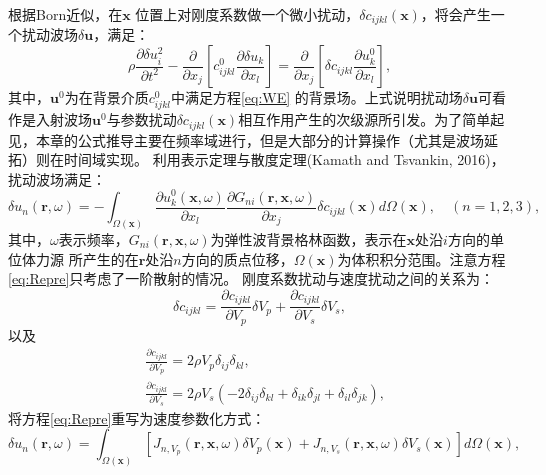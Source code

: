 根据Born近似，在$\mathbf{x}$ 位置上对刚度系数做一个微小扰动，$\delta
c_{ijkl}(\mathbf{x})$，将会产生一个扰动波场$\delta \mathbf{u}$，满足：
\begin{equation}
	\rho \frac{\partial \delta u^2_i}{\partial t^2}  -
	\frac{\partial}{\partial x_j}\left[c^0_{ijkl}\frac{\partial \delta u_{k}}{\partial
	x_l}\right]=\frac{\partial}{\partial
	x_j}\left[\delta c_{ijkl}\frac{\partial
	u^0_{k}}{\partial x_l}\right],
	\label{eq:BornApp}
\end{equation}
其中，$\mathbf{u}^0$为在背景介质$c^0_{ijkl}$中满足方程\eqref{eq:WE}
的背景场。上式说明扰动场$\delta \mathbf{u}$可看作是入射波场$\mathbf{u}^0$与参数扰动$\delta
c_{ijkl}(\mathbf{x})$相互作用产生的次级源所引发。为了简单起见，本章的公式推导主要在频率域进行，但是大部分的计算操作（尤其是波场延拓）则在时间域实现。
利用表示定理与散度定理(Kamath and Tsvankin, 2016)\cite{kamath2016elastic}，扰动波场满足：
\begin{equation}
	\delta u_n(\mathbf{r},\omega)=-\int_{\Omega(\mathbf{x})}{\frac{\partial
	u^0_{k}(\mathbf{x},\omega)}{\partial x_l}
	\frac{\partial G_{ni}(\mathbf{r},\mathbf{x},\omega)}{\partial
	x_j} \delta
	c_{ijkl}(\mathbf{x})}
	d\Omega(\mathbf{x}), \quad (n=1,2,3),
	\label{eq:Repre}
\end{equation}
其中，$\omega$表示频率，$G_{ni}(\mathbf{r},\mathbf{x},\omega)$为弹性波背景格林函数，表示在$\mathbf{x}$处沿$i$方向的单位体力源
所产生的在$\mathbf{r}$处沿$n$方向的质点位移，$\Omega(\mathbf{x})$为体积积分范围。注意方程\eqref{eq:Repre}只考虑了一阶散射的情况。
刚度系数扰动与速度扰动之间的关系为：
\begin{equation}
        \delta c_{ijkl}=\frac{\partial c_{ijkl}}{\partial V_p}\delta V_p
        +\frac{\partial c_{ijkl}}{\partial V_s}\delta V_s,
        \label{eq:deltaLame}
\end{equation}
以及
\begin{equation}
        \begin{split}
                &\frac{\partial c_{ijkl}}{\partial V_p}=2\rho V_p\delta_{ij}\delta_{kl},\\
                &\frac{\partial c_{ijkl}}{\partial V_s}=2\rho
                V_s(-2\delta_{ij}\delta_{kl}+\delta_{ik}\delta _{jl}+\delta_{il}\delta_{jk}),
        \end{split}
        \label{eq:deltaLame_vel}
\end{equation}
将方程\eqref{eq:Repre}重写为速度参数化方式：
\begin{equation}
        \delta
        u_n(\mathbf{r},\omega)=\int_{\Omega(\mathbf{x})}{\left[J_{n,V_p}(\mathbf{r,x},\omega)\delta
                V_p(\mathbf{x}) +J_{n,V_s}(\mathbf{r,x},\omega)\delta
        V_s(\mathbf{x})\right]
                }
                d\Omega(\mathbf{x}),
        \label{eq:SplitRepre}
\end{equation}
